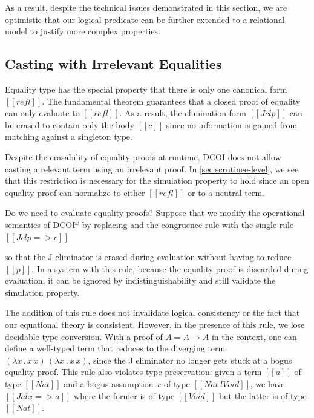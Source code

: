 \documentclass[acmsmall]{acmart}
\makeatletter
\theoremstyle{linked}
\theoremstyle{deflinked}
\theoremstyle{acmdefinition}
\newcommand{\sw}[1]{}
\newcommand{\dcoi}{DCOI\@\xspace}
\newcommand{\name}{\texorpdfstring{DCOI$^{\omega}$\@\xspace}{DCOI-omega}}
\makeatother
\begin{document}
As a result, despite the technical issues demonstrated in this section,
we are optimistic that our logical predicate can be further extended to
a relational model to justify more complex properties.


\subsection{Casting with Irrelevant Equalities}
\label{sec:castirrel}

Equality type has the special property that
there is only one canonical form $[[refl]]$.
The fundamental theorem guarantees that a closed proof of equality can only evaluate to
$[[refl]]$. As a result, the elimination form $[[J c l p]]$ can be
erased to contain only the body $[[c]]$
since no information is gained from
matching against a singleton type.

Despite the erasability of equality proofs at runtime,
\dcoi does not allow casting a relevant term using an irrelevant proof.
In \cref{sec:scrutinee-level}, we see that this restriction is
necessary for the simulation property to hold since an open equality
proof can normalize to either $[[refl]]$ or to a neutral term.

Do we need to evaluate equality proofs? Suppose that we
modify the operational semantics of \name
by replacing  and the congruence rule with the single rule $[[J c l p => c]]$ %
\sw{Maybe we should write this rule as a rule and give it name, if we have space.}
so that the J eliminator is erased during evaluation without having
to reduce $[[p]]$.
In a system with this rule, because the equality proof is discarded during evaluation, it can be ignored by
indistinguishability and still validate the simulation property.

The addition of this rule does not invalidate logical consistency or the fact that
our equational theory is consistent. However, in the presence of this rule,
we lose decidable type conversion.
With a proof of $A = A \rightarrow A$ in the context,
one can define a well-typed term that reduces to the diverging
term $(\lambda x \mathpunct{.} x \, x) \, (\lambda x \mathpunct{.} x \, x)$,
since the J eliminator no longer gets stuck at a bogus equality proof.
This rule also violates type preservation: given a term $[[a]]$ of type
$[[Nat]]$ and a bogus assumption $x$ of type $[[Nat ~ l Void]]$, we
have $[[J a l x => a]]$ where the former is of type $[[Void]]$ but the
latter is of type $[[Nat]]$.
\end{document}
